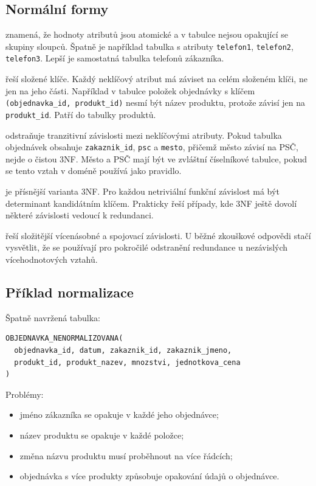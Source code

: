 \subsection{Normální formy}
 znamená, že hodnoty atributů jsou atomické a v tabulce nejsou
opakující se skupiny sloupců. Špatně je například tabulka s atributy \texttt{telefon1},
\texttt{telefon2}, \texttt{telefon3}. Lepší je samostatná tabulka telefonů zákazníka.

 řeší složené klíče. Každý neklíčový atribut má záviset na celém
složeném klíči, ne jen na jeho části. Například v tabulce položek objednávky s klíčem
\texttt{(objednavka\_id, produkt\_id)} nesmí být název produktu, protože závisí jen na
\texttt{produkt\_id}. Patří do tabulky produktů.

 odstraňuje tranzitivní závislosti mezi neklíčovými atributy. Pokud
tabulka objednávek obsahuje \texttt{zakaznik\_id}, \texttt{psc} a \texttt{mesto}, přičemž město
závisí na PSČ, nejde o čistou 3NF. Město a PSČ mají být ve zvláštní číselníkové tabulce, pokud se
tento vztah v doméně používá jako pravidlo.

 je přísnější varianta 3NF. Pro každou netriviální funkční
závislost má být determinant kandidátním klíčem. Prakticky řeší případy, kde 3NF ještě dovolí některé
závislosti vedoucí k redundanci.

 řeší složitější vícenásobné a spojovací závislosti. U běžné zkouškové odpovědi
stačí vysvětlit, že se používají pro pokročilé odstranění redundance u nezávislých vícehodnotových
vztahů.

\subsection{Příklad normalizace}
Špatně navržená tabulka:

{\small
\begin{verbatim}
OBJEDNAVKA_NENORMALIZOVANA(
  objednavka_id, datum, zakaznik_id, zakaznik_jmeno,
  produkt_id, produkt_nazev, mnozstvi, jednotkova_cena
)
\end{verbatim}
}

Problémy:
\begin{itemize}
  \item jméno zákazníka se opakuje v každé jeho objednávce;
  \item název produktu se opakuje v každé položce;
  \item změna názvu produktu musí proběhnout na více řádcích;
  \item objednávka s více produkty způsobuje opakování údajů o objednávce.
\end{itemize}

